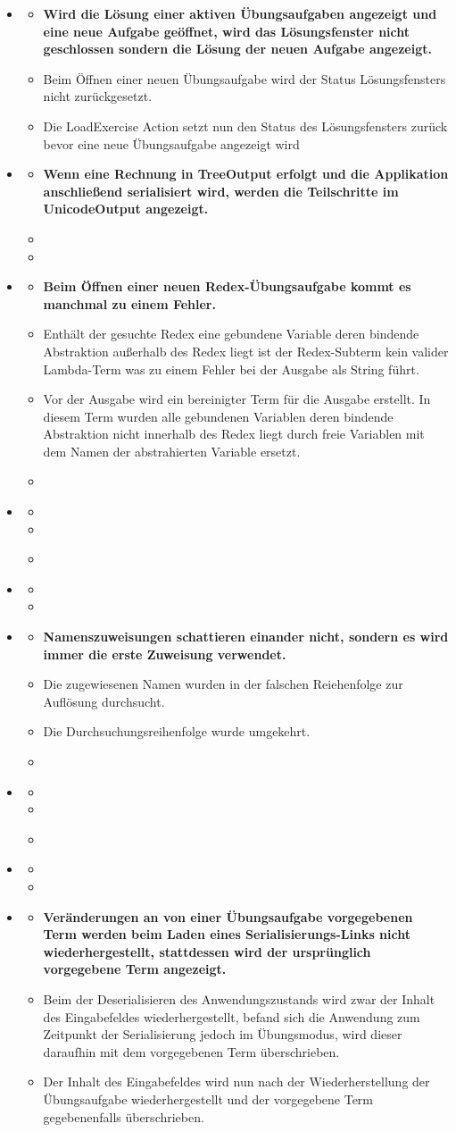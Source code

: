 \documentclass[parskip=full,11pt,openany]{scrreprt}
\begin{document}
\begin{itemize}[itemsep=3ex]

\newcommand{\issue}[3]{%
\item[]
\begin{itemize}[noitemsep]
\item[]\textbf{#1}
\item[\textbf{Grund:}]#2
\item[\textbf{Behebung:}]#3
\end{itemize}}


\issue{Wird die Lösung einer aktiven Übungsaufgaben angezeigt und eine neue Aufgabe geöffnet, wird das Lösungsfenster nicht geschlossen sondern die Lösung der neuen Aufgabe angezeigt. }
{Beim Öffnen einer neuen Übungsaufgabe wird der Status Lösungsfensters nicht zurückgesetzt.}
{Die LoadExercise Action setzt nun den Status des Lösungsfensters zurück bevor eine neue Übungsaufgabe angezeigt wird}

\issue{Wenn eine Rechnung in TreeOutput erfolgt und die Applikation anschließend serialisiert wird, werden die Teilschritte im UnicodeOutput angezeigt.}
{}
{}

\issue{Beim Öffnen einer neuen Redex-Übungsaufgabe kommt es manchmal zu einem Fehler.}
{Enthält der gesuchte Redex eine gebundene Variable deren bindende Abstraktion außerhalb des Redex liegt ist der Redex-Subterm kein valider Lambda-Term was zu einem Fehler bei der Ausgabe als String führt.}
{Vor der Ausgabe wird ein bereinigter Term für die Ausgabe erstellt. In diesem Term wurden alle gebundenen Variablen deren bindende Abstraktion nicht innerhalb des Redex liegt durch freie Variablen mit dem Namen der abstrahierten Variable ersetzt.}

\issue{}{}{}

\issue{}{}{}

\issue{Namenszuweisungen schattieren einander nicht, sondern es wird immer die erste Zuweisung verwendet.}
{Die zugewiesenen Namen wurden in der falschen Reiehenfolge zur Auflösung durchsucht.}
{Die Durchsuchungsreihenfolge wurde umgekehrt.}

\issue{}{}{}

\issue{}{}{}

\issue{Veränderungen an von einer Übungsaufgabe vorgegebenen Term  werden beim Laden eines Serialisierungs-Links nicht wiederhergestellt, stattdessen wird der ursprünglich vorgegebene Term angezeigt.}
{Beim der Deserialisieren des Anwendungszustands wird zwar der Inhalt des Eingabefeldes wiederhergestellt, befand sich die Anwendung zum Zeitpunkt der Serialisierung jedoch im Übungsmodus, wird dieser daraufhin mit dem vorgegebenen Term überschrieben.}
{Der Inhalt des Eingabefeldes wird nun nach der Wiederherstellung der Übungsaufgabe wiederhergestellt und der vorgegebene Term gegebenenfalls überschrieben.}


\end{itemize}
\end{document}
